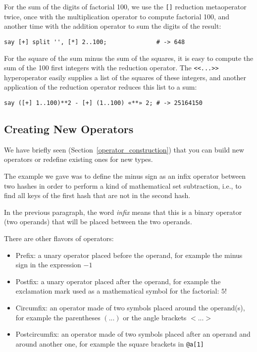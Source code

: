 For the sum of the digits of factorial 100, we use 
the \verb'[]' reduction metaoperator twice, once with 
the multiplication operator to compute factorial 100, 
and another time with the addition operator to sum 
the digits of the result:

\begin{verbatim}
say [+] split '', [*] 2..100;              # -> 648
\end{verbatim}

For the square of the sum minus the sum of the squares, 
it is easy to compute the sum of the 100 first integers 
with the reduction operator. The \verb'<<...>>' 
hyperoperator easily supplies a list of the squares of 
these integers, and another application of the reduction 
operator reduces this list to a sum:

\begin{verbatim}
say ([+] 1..100)**2 - [+] (1..100) «**» 2; # -> 25164150
\end{verbatim}

\subsection{Creating New Operators}

We have briefly seen (Section~\ref{operator_construction}) 
that you can build new operators or redefine existing ones 
for new types.

The example we gave was to define the minus sign 
as an infix operator between two hashes in order to 
perform a kind of mathematical set subtraction, i.e., 
to find all keys of the first hash that are not in the 
second hash.

In the previous paragraph, the word \emph{infix} means 
that this is a binary operator (two operands) that will 
be placed between the two operands. 

There are other flavors of operators:
\begin{itemize}
\item Prefix: a unary operator placed before the operand, 
for example the minus sign in the expression $-1$

\item Postfix: a unary operator placed after the operand, 
for example the exclamation mark used as a mathematical  
symbol for the factorial: $5!$

\item Circumfix: an operator made of two symbols placed 
around the operand(s), for example the parentheses $(...)$ 
or the angle brackets $<...>$

\item Postcircumfix: an operator made of two symbols placed 
after an operand and around another one, for example the 
square brackets in \verb'@a[1]'
\end{itemize}

